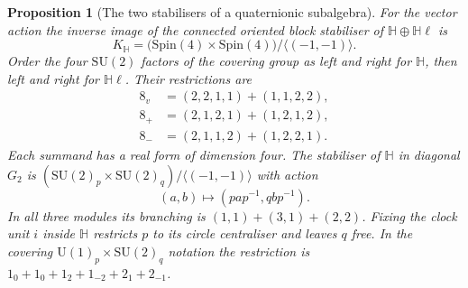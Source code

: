 \documentclass[aps,pra,onecolumn,superscriptaddress,nofootinbib,10pt]{revtex4-2}
\newtheorem{proposition}[theorem]{Proposition}
\theoremstyle{definition}
\theoremstyle{remark}
\newcommand{\SU}{\mathrm{SU}}
\newcommand{\U}{\mathrm{U}}
\begin{document}
\begin{proposition}[The two stabilisers of a quaternionic subalgebra]\label{tr:quaternion}
For the vector action the inverse image of the connected oriented
block stabiliser of \(\mathbb H\oplus\mathbb H\ell\) is
\[
 K_{\mathbb H}=
 \bigl(\mathrm{Spin}(4)\times\mathrm{Spin}(4)\bigr)/
                 \langle(-1,-1)\rangle .
\]
Order the four \(\SU(2)\) factors of the covering group
as left and right for \(\mathbb H\), then left and right for
\(\mathbb H\ell\). Their restrictions are
\begin{align}
 8_v&=(2,2,1,1)+(1,1,2,2),\nonumber\\
 8_+&=(2,1,2,1)+(1,2,1,2),\label{tr:branch4}\\
 8_-&=(2,1,1,2)+(1,2,2,1).\nonumber
\end{align}
Each summand has a real form of dimension four. The stabiliser of
\(\mathbb H\) in diagonal \(G_2\) is
\((\SU(2)_p\times\SU(2)_q)/\langle(-1,-1)\rangle\)
with action
\[
 (a,b)\longmapsto(pap^{-1},qbp^{-1}).
\]
In all three modules its branching is \((1,1)+(3,1)+(2,2)\).
Fixing the clock unit \(i\) inside \(\mathbb H\) restricts \(p\)
to its circle centraliser and leaves \(q\) free. In the covering
\(\U(1)_p\times\SU(2)_q\) notation the restriction
is \(1_0+1_0+1_2+1_{-2}+2_1+2_{-1}\).
\end{proposition}
\end{document}
